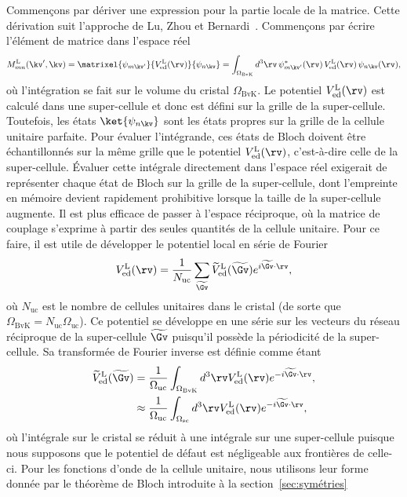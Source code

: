 Commençons par dériver une expression pour la partie locale de la matrice. Cette dérivation suit l'approche de Lu, Zhou et Bernardi~\cite{luEfficientInitioCalculations2019}. Commençons par écrire l'élément de matrice dans l'espace réel
\begin{equation}
    M^\text{L}_{mn}(\kv',\kv) = \matrixel{\psi_{m\kv'}}{V_\text{ed}^\text{L}(\rv)}{\psi_{n\kv}} = \int_{\Omega_\text{BvK}}d^3\rv\,\psi_{m\kv'}^*(\rv)\,V^\text{L}_\text{ed}(\rv)\,\psi_{n\kv}(\rv),\label{eqn:ML_réel}
\end{equation}
où l'intégration se fait sur le volume du cristal $\Omega_\text{BvK}$. Le potentiel $V_\text{ed}^\text{L}(\rv)$ est calculé dans une super-cellule et donc est défini sur la grille de la super-cellule. Toutefois, les états $\ket{\psi_{n\kv}}$ sont les états propres sur la grille de la cellule unitaire parfaite. Pour évaluer l'intégrande, ces états de Bloch doivent être échantillonnés sur la même grille que le potentiel $V_\text{ed}^\text{L}(\rv)$, c'est-à-dire celle de la super-cellule. Évaluer cette intégrale directement dans l'espace réel exigerait de représenter chaque état de Bloch sur la grille de la super-cellule, dont l'empreinte en mémoire devient rapidement prohibitive lorsque la taille de la super-cellule augmente. Il est plus efficace de passer à l'espace réciproque, où la matrice de couplage s'exprime à partir des seules quantités de la cellule unitaire. Pour ce faire, il est utile de développer le potentiel local en série de Fourier
\begin{equation}
    V_\text{ed}^\text{L}(\rv) = \frac{1}{N_\text{uc}}\sum_{\widetilde{\Gv}}\widetilde{V}_\text{ed}^\text{L}(\widetilde{\Gv})e^{i\widetilde{\Gv}\cdot\rv},
\end{equation}
où $N_\text{uc}$ est le nombre de cellules unitaires dans le cristal (de sorte que $\Omega_\text{BvK}=N_\text{uc}\Omega_\text{uc}$). Ce potentiel se développe en une série sur les vecteurs du réseau réciproque de la super-cellule $\widetilde{\Gv}$ puisqu'il possède la périodicité de la super-cellule. Sa transformée de Fourier inverse est définie comme étant
\begin{align}
    \widetilde{V}_\text{ed}^\text{L}(\widetilde{\Gv}) &= \frac{1}{\Omega_\text{uc}}\int_{\Omega_\text{BvK}}d^3\rv V_\text{ed}^\text{L}(\rv)e^{-i\widetilde{\Gv}\cdot\rv},\\
    &\approx \frac{1}{\Omega_\text{uc}}\int_{\Omega_\text{sc}}d^3\rv V_\text{ed}^\text{L}(\rv)e^{-i\widetilde{\Gv}\cdot\rv},
\end{align}
où l'intégrale sur le cristal se réduit à une intégrale sur une super-cellule puisque nous supposons que le potentiel de défaut est négligeable aux frontières de celle-ci. Pour les fonctions d'onde de la cellule unitaire, nous utilisons leur forme donnée par le théorème de Bloch introduite à la section~\ref{sec:symétries}
